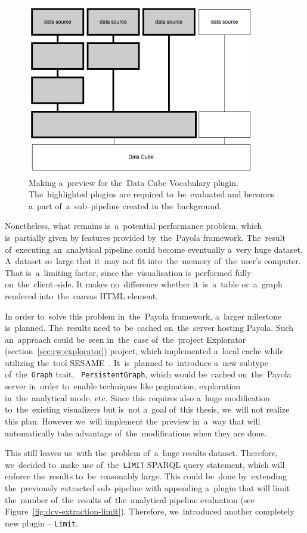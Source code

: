 \begin{figure}
	\centering
	\includegraphics[width=100mm]{img/dcv-extraction.png}
	\caption{Making a~preview for the~Data Cube Vocabulary plugin. The~highlighted
	plugins are required to~be~evaluated and becomes a~part of~a~sub--pipeline created
	in the~background.}
	\label{fig:dcv-extraction}
\end{figure}

Nonetheless, what remains is~a~potential performance problem, which is~partially given 
by features provided by~the~Payola framework. The~result of~executing an~analytical pipeline could become eventually a~very huge dataset. A~dataset so~large that it~may not fit into~the~memory of~the~user's computer. That is~a~limiting factor, since the~visualisation is~performed fully on~the~client--side. 
It makes no~difference whether it~is~a~table or~a~graph rendered into~the~canvas HTML element.

In order to~solve this problem in~the~Payola framework, a~larger milestone is~planned. The~results need to~be~cached on~the~server hosting Payola.
Such an~approach could be~seen in~the~case of~the~project 
Explorator (section~\ref{sec:rw:explorator}) project, which implemented a~local cache
while utilizing the~tool SESAME~\cite{sesame}. It~is~planned to~introduce a~new 
subtype of~the~\texttt{Graph} trait, ~\texttt{PersistentGraph}, which would be~cached on~the~Payola server in~order to~enable techniques like pagination, 
exploration in~the~analytical mode, etc. Since this requires also a~huge 
modification to~the~existing visualizers but is~not a~goal of~this thesis, we~will 
not realize this plan. However we~will implement the~preview in~a~way that will 
automatically take advantage of~the~modifications when they are done.

This still leaves us~with the~problem of~a~huge results dataset. Therefore, we~decided to~make use of~the~\texttt{LIMIT} SPARQL query statement, which will 
enforce the~results to~be~reasonably large. This could be~done by~extending the~previously extracted sub--pipeline with appending a~plugin that 
will limit the~number of~the~results of~the~analytical
pipeline evaluation (see Figure~\ref{fig:dcv-extraction-limit}). Therefore, we~introduced another completely new plugin -- \texttt{Limit}.

